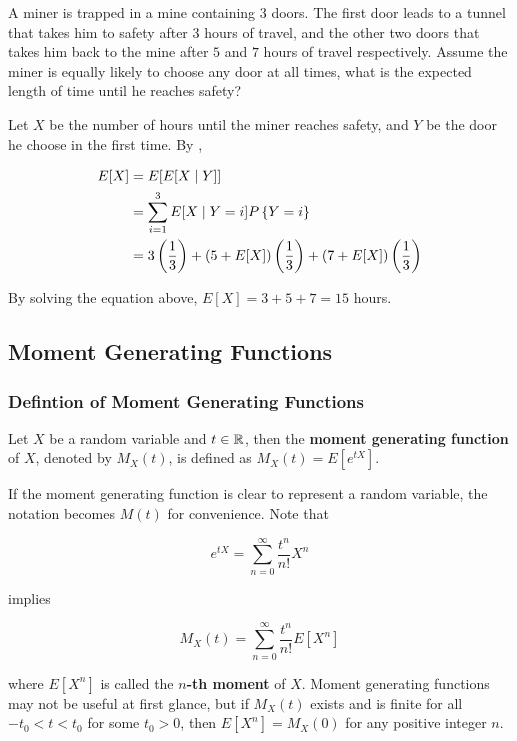 \documentclass[a4paper,12pt]{article}
\begin{document}
\begin{exm}
  A miner is trapped in a mine containing $3$ doors. The first door leads to a tunnel that takes him to safety after $3$ hours of travel, and the other two doors that takes him back to the mine after $5$ and $7$ hours of travel respectively. Assume the miner is equally likely to choose any door at all times, what is the expected length of time until he reaches safety?\n

  \ans Let $X$ be the number of hours until the miner reaches safety, and $Y$ be the door he choose in the first time. By \rthm[\sctd{1}],

  $$\begin{aligned}[t]
    E[X]&=E[E[X\mid Y]]\\
    &=\sum_{i=1}^{3}E[X\mid Y=i]P\left\{ Y=i\right\}\\
    &=3\left( \frac{1}{3}\right)+(5+E[X])\left( \frac{1}{3}\right)+(7+E[X])\left( \frac{1}{3}\right)
  \end{aligned}$$\s

  By solving the equation above, $E[X]=3+5+7=15$ hours.
\end{exm}

\subsection{Moment Generating Functions}
\subsubsection{Defintion of Moment Generating Functions}
\begin{dft}
  Let $X$ be a random variable and $t\in\mathbb{R}$, then the \textbf{moment generating function} of $X$, denoted by $M_{X}(t)$, is defined as $M_{X}(t)=E[e^{tX}]$.
\end{dft}\n

If the moment generating function is clear to represent a random variable, the notation becomes $M(t)$ for convenience. Note that

$$e^{tX}=\sum_{n=0}^{\infty}\frac{t^{n}}{n!}X^{n}$$\s

implies

$$M_{X}(t)=\sum_{n=0}^{\infty}\frac{t^{n}}{n!}E[X^{n}]$$\s

where $E[X^{n}]$ is called the \textbf{$n$-th moment} of $X$. Moment generating functions may not be useful at first glance, but if $M_{X}(t)$ exists and is finite for all $-t_{0}<t<t_{0}$ for some $t_{0}>0$, then $E[X^{n}]=M_{X}(0)$ for any positive integer $n$.
\end{document}

